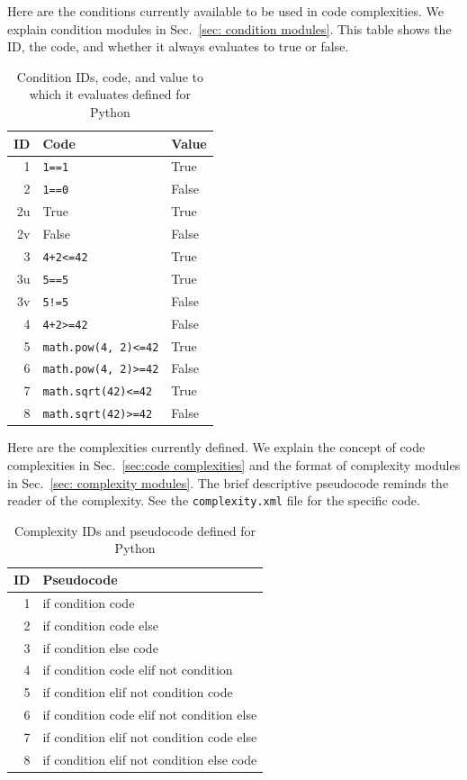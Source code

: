 \begin{appendices}
Here are the conditions currently available to be used in code complexities.
We explain condition modules in Sec.~\ref{sec: condition modules}.
This table shows the ID, the code, and whether it
always evaluates to true or false.

\begin{table}[H]
\centering
\caption{Condition IDs, code, and value to which it evaluates defined for
  Python}
\begin{tabular}{|r|l|l|}
\hline
\textbf{ID} & \textbf{Code} & \textbf{Value} \\
\hline
1 & \verb|1==1| & True \\
\hline
2 & \verb|1==0| & False \\
\hline
2u & True & True \\
\hline
2v & False & False \\
\hline
3 & \verb|4+2<=42| & True \\
\hline
3u & \verb|5==5| & True \\
\hline
3v & \verb|5!=5| & False \\
\hline
4 & \verb|4+2>=42| & False \\
\hline
5 & \verb|math.pow(4, 2)<=42| & True \\
\hline
6 & \verb|math.pow(4, 2)>=42| & False \\
\hline
7 & \verb|math.sqrt(42)<=42| & True \\
\hline
8 & \verb|math.sqrt(42)>=42| & False \\
\hline
\end{tabular}
\label{tab:condition IDs for Python}
\end{table}

\newpage

Here are the complexities currently defined.
We explain the concept of code complexities in Sec.~\ref{sec:code complexities} and
the format of complexity modules in Sec.~\ref{sec: complexity modules}.
The brief descriptive pseudocode reminds the reader of the complexity.
See the \verb|complexity.xml| file for the specific code.

\begin{table}[H]
\centering
\caption{Complexity IDs and pseudocode defined for Python}
\begin{tabular}{|r|l|}
\hline
\textbf{ID} & \textbf{Pseudocode} \\
\hline
 1 & if condition code \\
\hline
 2 & if condition code else \\
\hline
 3 & if condition else code \\
\hline
 4 & if condition code elif not condition \\
\hline
 5 & if condition elif not condition code \\
\hline
 6 & if condition code elif not condition else \\
\hline
 7 & if condition elif not condition code else \\
 \hline
 8 & if condition elif not condition else code \\
\hline


\end{tabular}
\end{table}
\end{appendices}
